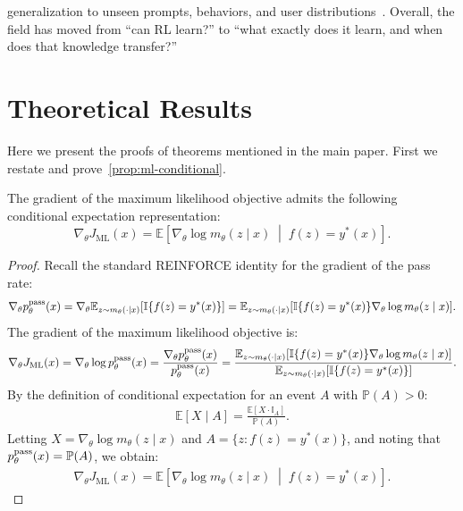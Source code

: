 \documentclass[10pt]{article} %
\begin{document}
generalization to unseen prompts, behaviors, and user distributions~\citep{kirk2024understandingeffectsrlhfllm,lin-etal-2024-limited,lambert2024rewardbenchevaluatingrewardmodels,jia2024generalizingrewardmodelingoutofdistribution,li2026theoreticalunderstandinggeneralizationrlhf}. Overall, the field has moved from “can RL learn?” to “what exactly does it learn, and when does that knowledge transfer?”

\newpage

\section{Theoretical Results}\label{app:proofs}

Here we present the proofs of theorems mentioned in the main paper. First we restate and prove~\cref{prop:ml-conditional}.

\begin{theorem}
The gradient of the maximum likelihood objective admits the following conditional
expectation representation:
\[
\nabla_\theta J_{\mathrm{ML}}(x)
=
\mathbb{E}\!\left[
\nabla_\theta \log m_\theta(z \mid x)
\;\middle|\;
f(z)=y^\ast(x)
\right].
\]
\end{theorem}

\begin{proof}
Recall the standard REINFORCE identity for the gradient of the pass rate:
\begin{align*}
\nabla_\theta p^{\mathrm{pass}}_{\theta}(x) = \nabla_\theta \mathbb{E}_{z \sim m_\theta(\cdot \mid x)}[\mathbb{I}\{f(z) = y^\ast(x)\}] = \mathbb{E}_{z \sim m_\theta(\cdot \mid x)}[\mathbb{I}\{f(z) = y^\ast(x)\} \nabla_\theta \log m_\theta(z \mid x)].
\end{align*}
The gradient of the maximum likelihood objective is:
\begin{align*}
\nabla_\theta J_{\mathrm{ML}}(x) = \nabla_\theta \log p^{\mathrm{pass}}_{\theta}(x) = \frac{\nabla_\theta p^{\mathrm{pass}}_{\theta}(x)}{p^{\mathrm{pass}}_{\theta}(x)} = \frac{\mathbb{E}_{z \sim m_\theta(\cdot \mid x)}[\mathbb{I}\{f(z) = y^\ast(x)\} \nabla_\theta \log m_\theta(z \mid x)]}{\mathbb{E}_{z \sim m_\theta(\cdot \mid x)}[\mathbb{I}\{f(z) = y^\ast(x)\}]}.
\end{align*}
By the definition of conditional expectation for an event $A$ with $\mathbb{P}(A) > 0$:
\begin{align*}
\mathbb{E}[X \mid A] = \frac{\mathbb{E}[X \cdot \mathbb{I}_A]}{\mathbb{P}(A)}.
\end{align*}
Letting $X = \nabla_\theta \log m_\theta(z \mid x)$ and $A = \{z : f(z) = y^\ast(x)\}$, and noting that $p^{\mathrm{pass}}_{\theta}(x) = \mathbb{P}(A)$, we obtain:
\begin{align*}
\nabla_\theta J_{\mathrm{ML}}(x) = \mathbb{E}\!\left[\nabla_\theta \log m_\theta(z \mid x) \;\middle|\; f(z) = y^\ast(x)\right].
\end{align*}
\end{proof}
\end{document}
